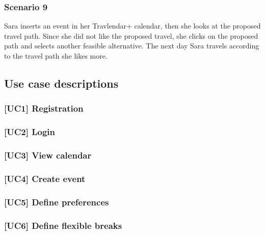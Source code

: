 	\subsubsection{Scenario 9}
		Sara inserts an event in her Travlendar+ calendar, then she looks at the proposed travel path. Since she did not like the proposed travel, she clicks on the proposed path and selects another feasible alternative. The next day Sara travels according to the travel path she likes more.	
	
\subsection{Use case descriptions}
\label{subsect:Use case descriptions}

	\subsubsection{[UC1] Registration}
		
		
	\subsubsection{[UC2] Login}
		
		
	\subsubsection{[UC3] View calendar}
		
		
	\subsubsection{[UC4] Create event}
		
		
	\subsubsection{[UC5] Define preferences}
		
		
	\subsubsection{[UC6] Define flexible breaks}
			
		
